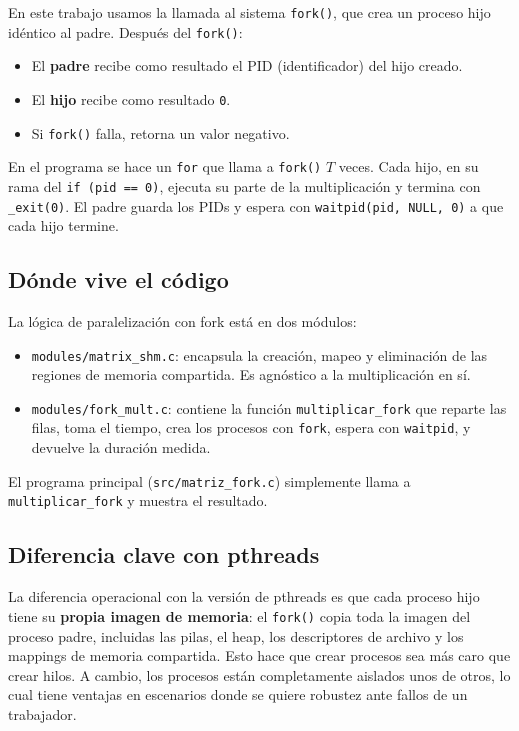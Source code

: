 En este trabajo usamos la llamada al sistema \texttt{fork()}, que crea un proceso hijo idéntico al padre. Después del \texttt{fork()}:

\begin{itemize}
    \item El \textbf{padre} recibe como resultado el PID (identificador) del hijo creado.
    \item El \textbf{hijo} recibe como resultado \texttt{0}.
    \item Si \texttt{fork()} falla, retorna un valor negativo.
\end{itemize}

En el programa se hace un \texttt{for} que llama a \texttt{fork()} $T$ veces. Cada hijo, en su rama del \texttt{if (pid == 0)}, ejecuta su parte de la multiplicación y termina con \texttt{\_exit(0)}. El padre guarda los PIDs y espera con \texttt{waitpid(pid, NULL, 0)} a que cada hijo termine.

\subsection{Dónde vive el código}

La lógica de paralelización con fork está en dos módulos:

\begin{itemize}
    \item \texttt{modules/matrix\_shm.c}: encapsula la creación, mapeo y eliminación de las regiones de memoria compartida. Es agnóstico a la multiplicación en sí.
    \item \texttt{modules/fork\_mult.c}: contiene la función \texttt{multiplicar\_fork} que reparte las filas, toma el tiempo, crea los procesos con \texttt{fork}, espera con \texttt{waitpid}, y devuelve la duración medida.
\end{itemize}

El programa principal (\texttt{src/matriz\_fork.c}) simplemente llama a \texttt{multiplicar\_fork} y muestra el resultado.

\subsection{Diferencia clave con pthreads}

La diferencia operacional con la versión de pthreads es que cada proceso hijo tiene su \textbf{propia imagen de memoria}: el \texttt{fork()} copia toda la imagen del proceso padre, incluidas las pilas, el heap, los descriptores de archivo y los mappings de memoria compartida. Esto hace que crear procesos sea más caro que crear hilos. A cambio, los procesos están completamente aislados unos de otros, lo cual tiene ventajas en escenarios donde se quiere robustez ante fallos de un trabajador.
